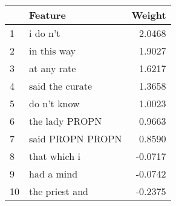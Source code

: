 \begin{tabular}{llr}
\toprule
{} &           Feature &  Weight \\
\midrule
1  &          i do n't &  2.0468 \\
2  &       in this way &  1.9027 \\
3  &       at any rate &  1.6217 \\
4  &   said the curate &  1.3658 \\
5  &       do n't know &  1.0023 \\
6  &    the lady PROPN &  0.9663 \\
7  &  said PROPN PROPN &  0.8590 \\
8  &      that which i & -0.0717 \\
9  &        had a mind & -0.0742 \\
10 &    the priest and & -0.2375 \\
\bottomrule
\end{tabular}
